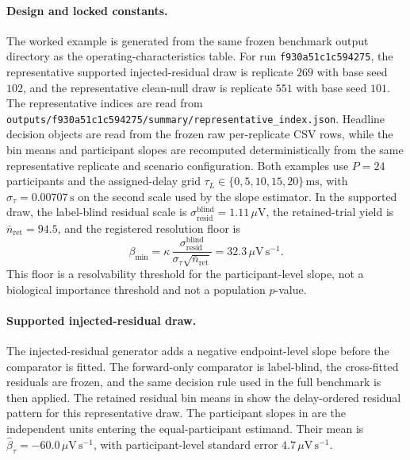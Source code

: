 
\paragraph{Design and locked constants.}
The worked example is generated from the same frozen benchmark output directory as the operating-characteristics table. For run \texttt{f930a51c1c594275}, the representative supported injected-residual draw is replicate \(269\) with base seed \(102\), and the representative clean-null draw is replicate \(551\) with base seed \(101\).
The representative indices are read from \texttt{outputs/f930a51c1c594275/summary/representative\_index.json}. Headline decision objects are read from the frozen raw per-replicate CSV rows, while the bin means and participant slopes are recomputed deterministically from the same representative replicate and scenario configuration.
Both examples use \(P=24\) participants and the assigned-delay grid \(\tau_L\in\{0, 5, 10, 15, 20\}\,\mathrm{ms}\), with \(\sigma_\tau=0.00707\,\mathrm{s}\) on the second scale used by the slope estimator.
In the supported draw, the label-blind residual scale is \(\sigma^{\mathrm{blind}}_{\mathrm{resid}}=1.11\,\mu\mathrm{V}\), the retained-trial yield is \(\bar n_{\mathrm{ret}}=94.5\), and the registered resolution floor is
\[
\beta_{\min}=\kappa\,\frac{\sigma^{\mathrm{blind}}_{\mathrm{resid}}}{\sigma_\tau\sqrt{\bar n_{\mathrm{ret}}}}=32.3\,\mu\mathrm{V\,s^{-1}} .
\]
This floor is a resolvability threshold for the participant-level slope, not a biological importance threshold and not a population \(p\)-value.

\paragraph{Supported injected-residual draw.}
The injected-residual generator adds a negative endpoint-level slope before the comparator is fitted. The forward-only comparator is label-blind, the cross-fitted residuals are frozen, and the same decision rule used in the full benchmark is then applied.
The retained residual bin means in  show the delay-ordered residual pattern for this representative draw. The participant slopes in  are the independent units entering the equal-participant estimand. Their mean is \(\widehat\beta_\tau=-60.0\,\mu\mathrm{V\,s^{-1}}\), with participant-level standard error \(4.7\,\mu\mathrm{V\,s^{-1}}\).

